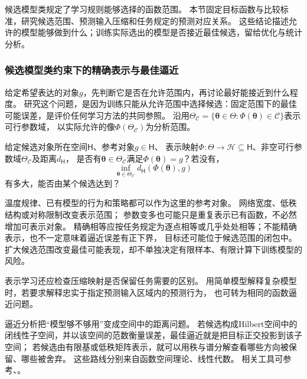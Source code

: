 候选模型类规定了学习规则能够选择的函数范围。
本节固定目标函数与比较标准，研究候选范围、预测输入压缩和任务规定的预测对应关系。
这些结论描述允许的模型能够做到什么；训练实际选出的模型是否接近最佳候选，留给优化与统计分析。

\subsubsection{候选模型类约束下的精确表示与最佳逼近}
\label{sec:future-analysis-representation}

给定希望表达的对象$g$，先判断它是否在允许范围内，再讨论最好能接近到什么程度。
研究这个问题，是因为训练只能从允许范围中选择候选：固定范围下的最佳可能误差，是评价任何学习方法的共同参照。
沿用$\Theta_{\mathcal C}=\{\bm\theta\in\Theta:\Phi(\bm\theta)\in\mathcal C\}$表示可行参数域，
以实际允许的像$\Phi(\Theta_{\mathcal C})$为分析范围。

\begin{mathproblem}[目标的表示与逼近]
  \label{question:future-representation}
  给定候选对象所在空间$\mathsf H$、参考对象$g\in\mathsf H$、
  表示映射$\Phi:\Theta\to\mathcal H\subseteq\mathsf H$、非空可行参数域$\Theta_{\mathcal C}$及距离$d_{\mathsf H}$，
  是否有$\bm\theta\in\Theta_{\mathcal C}$满足$\Phi(\bm\theta)=g$？若没有，
  \[
    \inf_{\bm\theta\in\Theta_{\mathcal C}}
      d_{\mathsf H}(\Phi(\bm\theta),g)
  \]
  有多大，能否由某个候选达到？
\end{mathproblem}

温度规律、已有模型的行为和策略都可以作为这里的参考对象。
网络宽度、低秩结构或对称限制改变表示范围；
参数变多也可能只是重复表示已有函数，不必然增加可表示对象。
精确相等应按任务规定为逐点相等或几乎处处相等；不能精确表示，也不一定意味着逼近误差有正下界，
目标还可能位于候选范围的闭包中。扩大候选范围改变最佳可能表现，却不单独决定有限样本、有限计算下训练模型的风险。

表示学习还应检查压缩映射是否保留任务需要的区别。
用简单模型解释复杂模型时，若要求解释忠实于指定预测输入区域内的预测行为，
也可转为相同的函数逼近问题。

逼近分析把“模型够不够用”变成空间中的距离问题。
若候选构成Hilbert空间中的闭线性子空间，并以该空间的范数衡量误差，最佳逼近就是把目标正交投影到该子空间；
若候选由有限基或低秩矩阵表示，就可以用秩与谱分解查看哪些方向被保留、哪些被舍弃。
这些路线分别来自函数空间理论、线性代数。
相关工具可参考、。

